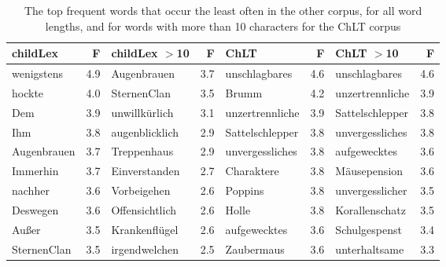 \documentclass[manuscript]{stjour}
\begin{document}
\begin{table}[!htbp]
\caption{The top frequent words that occur the least often in the other corpus, for all word lengths, and for words with more than 10 characters for the ChLT corpus}
\centering
\begin{tabular}{lrlrlrlr}
  \hline
childLex & F & childLex $>$10 & F & ChLT & F & ChLT $>$10 & F \\ 
  \hline
wenigstens & 4.9 & Augenbrauen & 3.7 & unschlagbares & 4.6 & unschlagbares & 4.6 \\ 
  hockte & 4.0 & SternenClan & 3.5 & Brumm & 4.2 & unzertrennliche & 3.9 \\ 
  Dem & 3.9 & unwillkürlich & 3.1 & unzertrennliche & 3.9 & Sattelschlepper & 3.8 \\ 
  Ihm & 3.8 & augenblicklich & 2.9 & Sattelschlepper & 3.8 & unvergessliches & 3.8 \\ 
  Augenbrauen & 3.7 & Treppenhaus & 2.9 & unvergessliches & 3.8 & aufgewecktes & 3.6 \\ 
  Immerhin & 3.7 & Einverstanden & 2.7 & Charaktere & 3.8 & Mäusepension & 3.6 \\ 
  nachher & 3.6 & Vorbeigehen & 2.6 & Poppins & 3.8 & unvergesslicher & 3.5 \\ 
  Deswegen & 3.6 & Offensichtlich & 2.6 & Holle & 3.8 & Korallenschatz & 3.5 \\ 
  Außer & 3.5 & Krankenflügel & 2.6 & aufgewecktes & 3.6 & Schulgespenst & 3.4 \\ 
  SternenClan & 3.5 & irgendwelchen & 2.5 & Zaubermaus & 3.6 & unterhaltsame & 3.3 \\ 
   \hline
\end{tabular}
\label{words-chlt-low}
\end{table}
\end{document}
